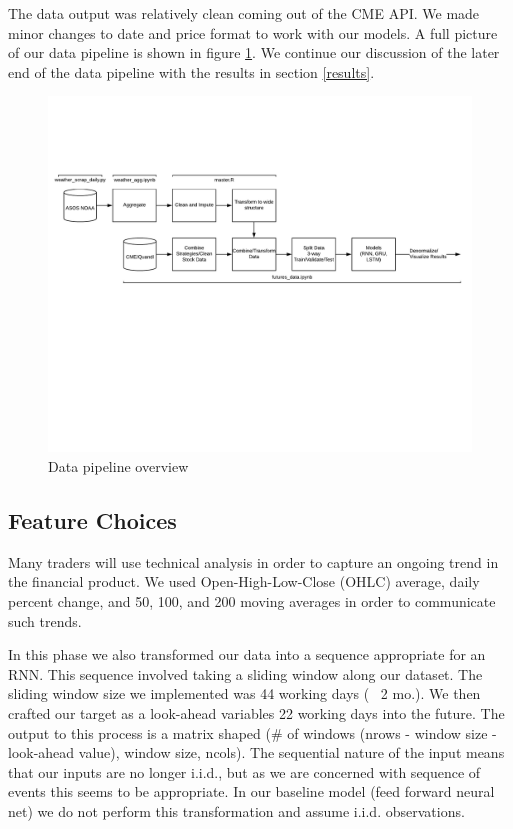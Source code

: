 \documentclass[twoside,11pt]{article}
\begin{document}
The data output was relatively clean coming out of the CME API. We made minor changes to date and price format to work with our models. A full picture of our data pipeline is shown in figure \ref{fig:datapipeline}. We continue our discussion of the later end of the data pipeline with the results in section \ref{results}.

	\begin{figure}[htbp]
	\centering
	\includegraphics[width=5in]{DataPipeline.png}
	\caption{Data pipeline overview}
	\label{fig:datapipeline}
\end{figure}

\subsection{Feature Choices}

Many traders will use technical analysis in order to capture an ongoing trend in the financial product. We used Open-High-Low-Close (OHLC) average, daily percent change, and 50, 100, and 200 moving averages in order to communicate such trends.  

In this phase we also transformed our data into a sequence appropriate for an RNN. This sequence involved taking a sliding window along our dataset. The sliding window size we implemented was 44 working days (~ 2 mo.). We then crafted our target as a look-ahead variables 22 working days into the future. The output to this process is a matrix shaped (\# of windows (nrows - window size - look-ahead value), window size, ncols). The sequential nature of the input means that our inputs are no longer i.i.d., but as we are concerned with sequence of events this seems to be appropriate. In our baseline model (feed forward neural net) we do not perform this transformation and assume i.i.d. observations. 
\end{document}
